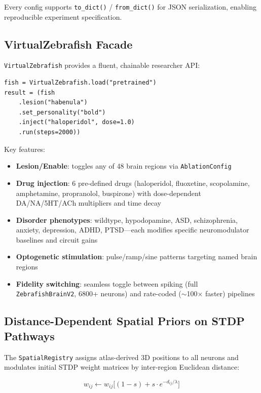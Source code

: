 \documentclass[11pt,a4paper]{article}
\begin{document}
Every config supports \texttt{to\_dict()} / \texttt{from\_dict()} for JSON serialization,
enabling reproducible experiment specification.

\subsection{VirtualZebrafish Facade}

\texttt{VirtualZebrafish} provides a fluent, chainable researcher API:

\begin{verbatim}
fish = VirtualZebrafish.load("pretrained")
result = (fish
    .lesion("habenula")
    .set_personality("bold")
    .inject("haloperidol", dose=1.0)
    .run(steps=2000))
\end{verbatim}

\noindent
Key features:
\begin{itemize}[nosep]
  \item \textbf{Lesion/Enable}: toggles any of 48 brain regions via \texttt{AblationConfig}
  \item \textbf{Drug injection}: 6 pre-defined drugs (haloperidol, fluoxetine,
    scopolamine, amphetamine, propranolol, buspirone) with
    dose-dependent DA/NA/5HT/ACh multipliers and time decay
  \item \textbf{Disorder phenotypes}: wildtype, hypodopamine, ASD, schizophrenia,
    anxiety, depression, ADHD, PTSD---each modifies specific
    neuromodulator baselines and circuit gains
  \item \textbf{Optogenetic stimulation}: pulse/ramp/sine patterns targeting
    named brain regions
  \item \textbf{Fidelity switching}: seamless toggle between spiking
    (full \texttt{ZebrafishBrainV2}, 6800+ neurons) and rate-coded
    ($\sim$100$\times$ faster) pipelines
\end{itemize}

\subsection{Distance-Dependent Spatial Priors on STDP Pathways}

The \texttt{SpatialRegistry} assigns atlas-derived 3D positions to all neurons
and modulates initial STDP weight matrices by inter-region Euclidean distance:

\begin{equation}
  w_{ij} \leftarrow w_{ij} \bigl[(1 - s) + s \cdot e^{-d_{ij}/\lambda}\bigr]
\end{equation}
\end{document}
